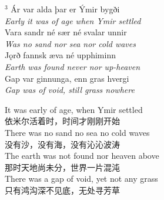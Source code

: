\begin{paracol}{2}
    \noindent
    $^3 $ Ár var alda þar er Ýmir bygði\\
    \textit{Early it was of age when Ymir settled}\\
    Vara sandr né sær né svalar unnir\\
    \textit{Was no sand nor sea nor cold waves}\\
    Jǫrð fannsk æva né upphiminn\\
    \textit{Earth was found never nor up-heaven}\\
    Gap var ginnunga, enn gras hvergi\\
    \textit{Gap was of void, still grass nowhere}\\
    \switchcolumn

    \noindent
    It was early of age, when Ymir settled\\
    依米尔活着时，时间才刚刚开始\\
    There was no sand no sea no cold waves\\
    没有沙，没有海，没有沁沁波涛\\
    The earth was not found nor heaven above\\
    那时天地尚未分，世界一片混沌\\
    There was a gap of void, yet not any grass \\
    只有鸿沟深不见底，无处寻芳草\\

\end{paracol}


